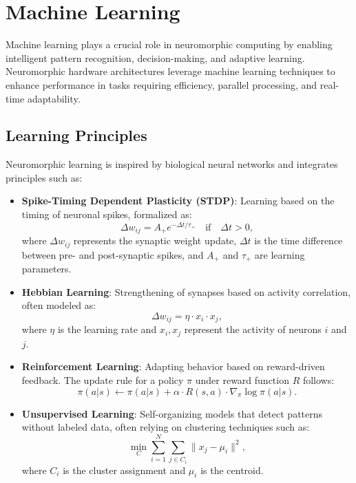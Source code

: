 \documentclass{article}
\theoremstyle{plain}
\begin{document}
\section{Machine Learning}

Machine learning plays a crucial role in neuromorphic computing by enabling intelligent pattern recognition, decision-making, and adaptive learning. Neuromorphic hardware architectures leverage machine learning techniques to enhance performance in tasks requiring efficiency, parallel processing, and real-time adaptability.

\subsection{Learning Principles}
Neuromorphic learning is inspired by biological neural networks and integrates principles such as:
\begin{itemize}
    \item \textbf{Spike-Timing Dependent Plasticity (STDP)}: Learning based on the timing of neuronal spikes, formalized as:
    \begin{equation}
        \Delta w_{ij} = A_+ e^{-\Delta t/\tau_+} \quad \text{if} \quad \Delta t > 0,
    \end{equation}
    where $\Delta w_{ij}$ represents the synaptic weight update, $\Delta t$ is the time difference between pre- and post-synaptic spikes, and $A_+$ and $\tau_+$ are learning parameters.
    
    \item \textbf{Hebbian Learning}: Strengthening of synapses based on activity correlation, often modeled as:
    \begin{equation}
        \Delta w_{ij} = \eta \cdot x_i \cdot x_j,
    \end{equation}
    where $\eta$ is the learning rate and $x_i, x_j$ represent the activity of neurons $i$ and $j$.
    
    \item \textbf{Reinforcement Learning}: Adapting behavior based on reward-driven feedback. The update rule for a policy $\pi$ under reward function $R$ follows:
    \begin{equation}
        \pi(a|s) \leftarrow \pi(a|s) + \alpha \cdot R(s,a) \cdot \nabla_{\pi} \log \pi(a|s).
    \end{equation}
    
    \item \textbf{Unsupervised Learning}: Self-organizing models that detect patterns without labeled data, often relying on clustering techniques such as:
    \begin{equation}
        \min_{C} \sum_{i=1}^{N} \sum_{j \in C_i} \|x_j - \mu_i\|^2,
    \end{equation}
    where $C_i$ is the cluster assignment and $\mu_i$ is the centroid.
\end{itemize}
\end{document}
